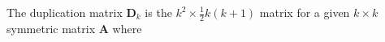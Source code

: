 The duplication matrix
$
\mathbf{D}_{k}
$
is the 
$
k^2 
\times 
\frac{1}{2}
k 
\left( 
k 
+ 
1 
\right)
$
matrix
for a given
$
k 
\times 
k
$ 
symmetric matrix 
$
\mathbf{A}
$
where
